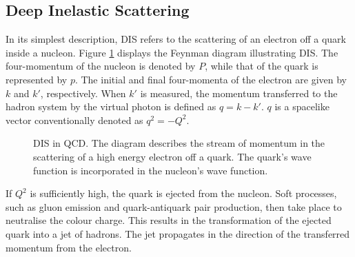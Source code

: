 \subsection{Deep Inelastic Scattering}
\label{10.10::deep_inelastic_scattering}
    In its simplest description, DIS refers to the scattering of an electron off a quark inside a nucleon.
    Figure \ref{fig::10.10::dis_diagram} displays the Feynman diagram illustrating DIS.
    The four-momentum of the nucleon is denoted by $P$, while that of the quark is represented by $p$.
    The initial and final four-momenta of the electron are given by $k$ and $k'$, respectively.
    When $k'$ is measured, the momentum transferred to the hadron system by the virtual photon is defined as $q = k - k'$.
    $q$ is a spacelike vector conventionally denoted as $q^2 = -Q^2$.

    \begin{figure}[h!]
        \caption[Deep Inelastic Scattering in Quantum Chromodynamics]
        {DIS in QCD.
        The diagram describes the stream of momentum in the scattering of a high energy electron off a quark.
        The quark's wave function is incorporated in the nucleon's wave function.}
        \label{fig::10.10::dis_diagram}
    \end{figure}

    If $Q^2$ is sufficiently high, the quark is ejected from the nucleon.
    Soft processes, such as gluon emission and quark-antiquark pair production, then take place to neutralise the colour charge.
    This results in the transformation of the ejected quark into a jet of hadrons.
    The jet propagates in the direction of the transferred momentum from the electron.

    
    
    
